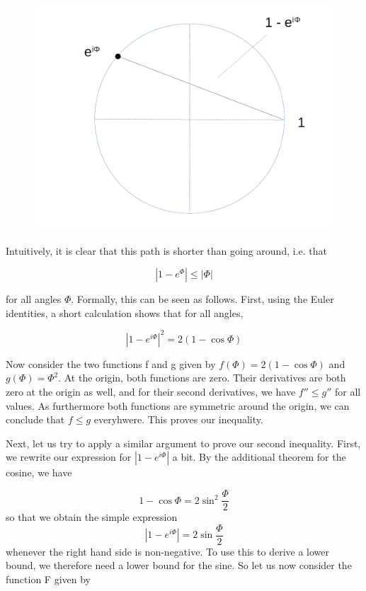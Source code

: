 \documentclass[a4paper, draft]{article}
\theoremstyle{own}
\theoremstyle{remark}
\begin{document}
\begin{figure}[ht]
\centering
\includegraphics[width=1.0\linewidth]{images/LineSegments}
\caption[Estimates on the unit circle]{}
\label{fig:LineSegments}
\end{figure}

Intuitively, it is clear that this path is shorter than going around, i.e. that 

$$
| 1 - e^{\Phi} | \leq |\Phi|
$$

for all angles $\Phi$. Formally, this can be seen as follows. First, using the Euler identities, a short calculation shows that for all angles,

$$
|1 - e^{i\Phi}|^2 = 2(1 - \cos \Phi)
$$

Now consider the two functions f and g given by $f(\Phi) = 2(1 - \cos \Phi)$ and $g(\Phi)  = \Phi^2$. At the origin, both functions are zero. Their derivatives are both zero at the origin as well, and for their second derivatives, we have $f'' \leq g''$ for all values. As furthermore both functions are symmetric around the origin, we can conclude that $f \leq g$ everyhwere. This proves our inequality.

Next, let us try to apply a similar argument to prove our second inequality. First, we rewrite our expression for $|1 - e^{i\Phi}|$ a bit. By the additional theorem for the cosine, we have

$$
1 - \cos \Phi = 2 \sin^2 \frac{\Phi}{2}
$$
so that we obtain the simple expression
$$
| 1- e^{i\Phi}| = 2 \sin \frac{\Phi}{2}
$$
whenever the right hand side is non-negative. To use this to derive a lower bound, we therefore need a lower bound for the sine. So let us now consider the function F given by
\end{document}

